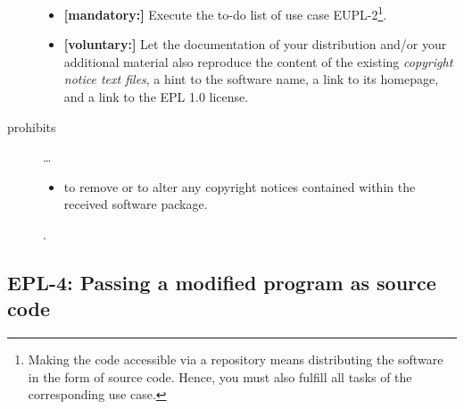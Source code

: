 \begin{description}
\begin{itemize}
  \item \textbf{[mandatory:]} Execute the to-do list of use case EUPL-2\footnote{
  Making the code accessible via a repository means distributing the software in
  the form of source code. Hence, you must also fulfill all tasks of the
  corresponding use case.}.
  
  \item \textbf{[voluntary:]} Let the documentation of your distribution and/or
  your additional material also reproduce the content of the existing
  \emph{copyright notice text files}, a hint to the software name, a link to its
  homepage, and a link to the EPL 1.0 license.
    
\end{itemize}

\item[prohibits] \ldots
\begin{itemize}
  \item to remove or to alter any copyright notices contained within the
  received software package.
\end{itemize}.

\end{description}

\subsection{EPL-4: Passing a modified program as source code}
\label{OSUC-04-EPL} 

